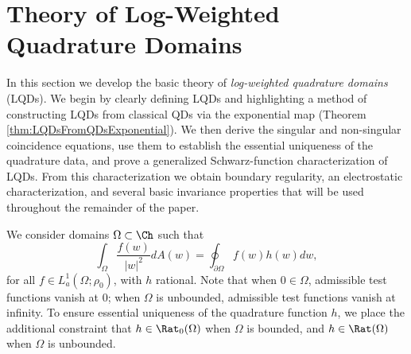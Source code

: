 \documentclass{article}
\numberwithin{equation}{section}
\begin{document}
\section{Theory of Log-Weighted Quadrature Domains}\label{sec:TheoryOfLQDs}
In this section we develop the basic theory of \emph{log-weighted quadrature domains} (LQDs). We begin by clearly defining LQDs and highlighting a method of constructing LQDs from classical QDs via the exponential map (Theorem \ref{thm:LQDsFromQDsExponential}). We then derive the singular and non-singular coincidence equations, use them to establish the essential uniqueness of the quadrature data, and prove a generalized Schwarz-function characterization of LQDs. From this characterization we obtain boundary regularity, an electrostatic characterization, and several basic invariance properties that will be used throughout the remainder of the paper.

We consider domains $\Omega\subset\Ch$ such that
\begin{equation}\label{eqn:LQDQID}
\int_{\Omega}\dfrac{f(w)}{|w|^2}dA(w)=\oint_{\partial\Omega}f(w)h(w)dw,
\end{equation}
for all $f\in L_a^1(\Omega;\rho_0)$, with $h$ rational. Note that when $0\in\Omega$, admissible test functions vanish at $0$; when $\Omega$ is unbounded, admissible test functions vanish at infinity. To ensure essential uniqueness of the quadrature function $h$, we place the additional constraint that $h\in\Rat_0(\Omega)$ when $\Omega$ is bounded, and $h\in\Rat(\Omega)$ when $\Omega$ is unbounded.
\end{document}
